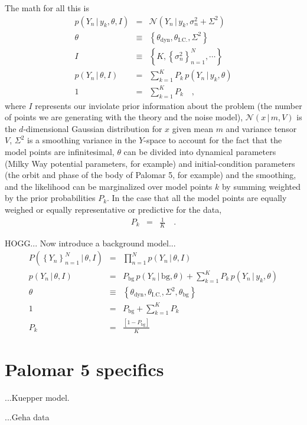\documentclass[12pt,pdftex,preprint]{aastex}
\newcommand{\setof}[1]{\left\{{#1}\right\}}
\newcommand{\given}{\,|\,}
\newcommand{\bg}{\mathrm{bg}}
\newcommand{\dyn}{\mathrm{dyn}}
\newcommand{\ic}{\mathrm{I.C.}}
\newcommand{\normal}{\mathscr{N}}
\begin{document}
The math for all this is
\begin{eqnarray}
p(Y_n\given y_k,\theta,I) &=& \normal(Y_n\given y_k,\sigma^2_n+\Sigma^2)
\\
\theta &\equiv& \setof{\theta_\dyn, \theta_\ic, \Sigma^2}
\\
I &\equiv& \setof{K, \setof{\sigma^2_n}_{n=1}^N, \cdots}
\\
p(Y_n\given\theta,I) &=& \sum_{k=1}^K P_k\,p(Y_n\given y_k,\theta)
\\
1 &=& \sum_{k=1}^K P_k
\quad ,
\end{eqnarray}
where $I$ represents our inviolate prior information about the problem
(the number of points we are generating with the theory and the noise
model), $\normal(x\given m, V)$ is the $d$-dimensional Gaussian
distribution for $x$ given mean $m$ and variance tensor $V$,
$\Sigma^2$ is a smoothing variance in the $Y$-space to account for the
fact that the model points are infinitesimal, $\theta$ can be divided
into dynamical parameters (Milky Way potential parameters, for
example) and initial-condition parameters (the orbit and phase of the
body of Palomar 5, for example) and the smoothing, and the likelihood
can be marginalized over model points $k$ by summing weighted by the
prior probabilities $P_k$.  In the case that all the model points are
equally weighed or equally representative or predictive for the data,
\begin{eqnarray}
P_k &=& \frac{1}{K}
\quad .
\end{eqnarray}

HOGG... Now introduce a background model...
\begin{eqnarray}
P(\setof{Y_n}_{n=1}^N\given\theta,I) &=& \prod_{n=1}^N p(Y_n\given\theta,I)
\\
p(Y_n\given\theta,I) &=& P_\bg\,p(Y_n\given \bg,\theta) + \sum_{k=1}^K P_k\,p(Y_n\given y_k,\theta)
\\
\theta &\equiv& \setof{\theta_\dyn, \theta_\ic, \Sigma^2, \theta_\bg}
\\
1 &=& P_\bg + \sum_{k=1}^K P_k
\\
P_k &=& \frac{[1 - P_\bg]}{K}
\end{eqnarray}

\section{Palomar 5 specifics}

...Kuepper model.

...Geha data
\end{document}
